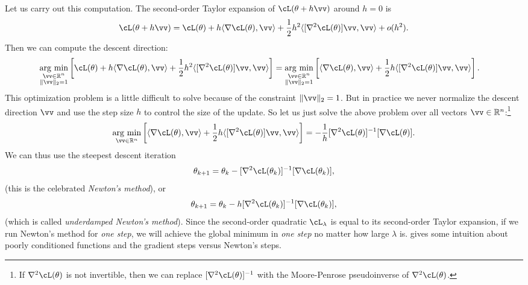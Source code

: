 \documentclass[../../book-main.tex]{subfiles}
\begin{document}
Let us carry out this computation. The second-order Taylor expansion of \(\cL(\theta + h\vv)\) around \(h = 0\) is 
\begin{equation}
    \cL(\theta + h\vv) = \cL(\theta) + h\ip{\nabla \cL(\theta)}{\vv} + \frac{1}{2}h^{2}\ip{[\nabla^{2}\cL(\theta)]\vv}{\vv} + o(h^{2}).
\end{equation}
Then we can compute the descent direction:
\begin{align}
    \argmin_{\substack{\vv \in \R^{n} \\ \norm{\vv}_{2} = 1}}\bs{\cL(\theta) + h\ip{\nabla \cL(\theta)}{\vv} + \frac{1}{2}h^{2}\ip{[\nabla^{2}\cL(\theta)]\vv}{\vv}} 
    &= \argmin_{\substack{\vv \in \R^{n} \\ \norm{\vv}_{2} = 1}}\bs{\ip{\nabla \cL(\theta)}{\vv} + \frac{1}{2}h\ip{[\nabla^{2}\cL(\theta)]\vv}{\vv}}.
\end{align}
This optimization problem is a little difficult to solve because of the constraint \(\norm{\vv}_{2} = 1\). But in practice we never normalize the descent direction \(\vv\) and use the step size \(h\) to control the size of the update. So let us just solve the above problem over all vectors \(\vv \in \R^{n}\):\footnote{If \(\nabla^{2}\cL(\theta)\) is not invertible, then we can replace \([\nabla^{2}\cL(\theta)]^{-1}\) with the Moore-Penrose pseudoinverse of \(\nabla^{2}\cL(\theta)\).}
\begin{equation}
    \argmin_{\vv \in \R^{n}}\bs{\ip{\nabla \cL(\theta)}{\vv} + \frac{1}{2}h\ip{[\nabla^{2}\cL(\theta)]\vv}{\vv}} = -\frac{1}{h}[\nabla^{2}\cL(\theta)]^{-1}[\nabla \cL(\theta)].
\end{equation}
We can thus use the steepest descent iteration 
\begin{equation}
    \theta_{k + 1} = \theta_{k} - [\nabla^{2}\cL(\theta_{k})]^{-1}[\nabla \cL(\theta_{k})],
\end{equation}
(this is the celebrated \textit{Newton's method}), or 
\begin{equation}
    \theta_{k + 1} = \theta_{k} - h[\nabla^{2}\cL(\theta_{k})]^{-1}[\nabla \cL(\theta_{k})],
\end{equation}
(which is called \textit{underdamped Newton's method}). Since the second-order quadratic \(\cL_{\lambda}\) is equal to its second-order Taylor expansion, if we run Newton's method for \textit{one step}, we will achieve the global minimum in \textit{one step} no matter how large \(\lambda\) is.  gives some intuition about poorly conditioned functions and the gradient steps versus Newton's steps.
\end{document}

